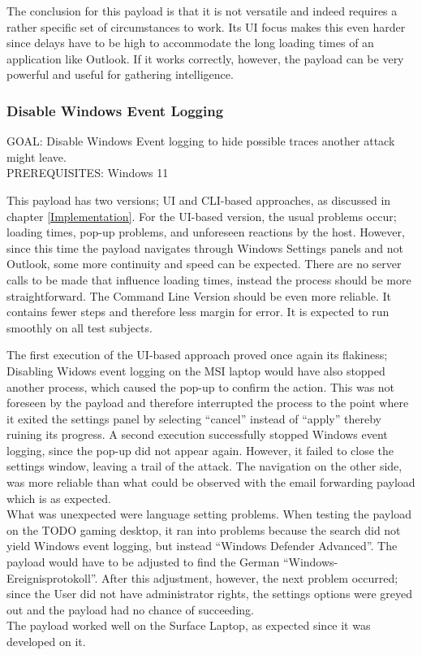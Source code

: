 The conclusion for this payload is that it is not versatile and indeed requires a rather specific set of circumstances to work. Its UI focus makes this even harder since delays have to be high to accommodate the long loading times of an application like Outlook. If it works correctly, however, the payload can be very powerful and useful for gathering intelligence. 


\subsubsection{Disable Windows Event Logging}

GOAL: Disable Windows Event logging to hide possible traces another attack might leave. \\
PREREQUISITES: Windows 11

This payload has two versions; UI and CLI-based approaches, as discussed in chapter \ref{Implementation}. For the UI-based version, the usual problems occur; loading times, pop-up problems, and unforeseen reactions by the host. However, since this time the payload navigates through Windows Settings panels and not Outlook, some more continuity and speed can be expected. There are no server calls to be made that influence loading times, instead the process should be more straightforward. 
The Command Line Version should be even more reliable. It contains fewer steps and therefore less margin for error. It is expected to run smoothly on all test subjects.

The first execution of the UI-based approach proved once again its flakiness; Disabling Widows event logging on the MSI laptop would have also stopped another process, which caused the pop-up to confirm the action. This was not foreseen by the payload and therefore interrupted the process to the point where it exited the settings panel by selecting ``cancel'' instead of ``apply'' thereby ruining its progress. A second execution successfully stopped Windows event logging, since the pop-up did not appear again. However, it failed to close the settings window, leaving a trail of the attack. The navigation on the other side, was more reliable than what could be observed with the email forwarding payload which is as expected. \\
What was unexpected were language setting problems. When testing the payload on the TODO gaming desktop, it ran into problems because the search did not yield Windows event logging, but instead ``Windows Defender Advanced''. The payload would have to be adjusted to find the German ``Windows-Ereignisprotokoll''. After this adjustment, however, the next problem occurred; since the User did not have administrator rights, the settings options were greyed out and the payload had no chance of succeeding. \\
The payload worked well on the Surface Laptop, as expected since it was developed on it.

